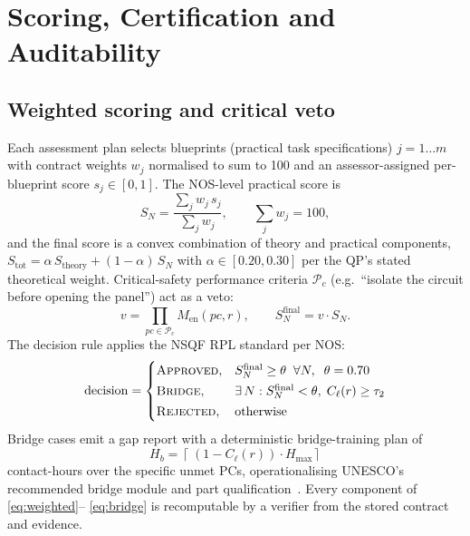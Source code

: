 \documentclass[conference]{IEEEtran}
\begin{document}
\section{Scoring, Certification and Auditability}
\label{sec:scoring}
\subsection{Weighted scoring and critical veto}
Each assessment plan selects blueprints (practical task specifications) $j=1\ldots m$ with
contract weights $w_j$ normalised to sum to 100 and an assessor-assigned per-blueprint
score $s_j \in [0,1]$. The NOS-level practical score is
\begin{equation}
S_N = \frac{\sum_{j} w_j\, s_j}{\sum_{j} w_j}, \qquad \sum_j w_j = 100,
\label{eq:weighted}
\end{equation}
and the final score is a convex combination of theory and practical components,
$S_{\mathrm{tot}} = \alpha\, S_{\mathrm{theory}} + (1-\alpha)\, S_N$ with
$\alpha \in [0.20, 0.30]$ per the QP's stated theoretical weight. Critical-safety
performance criteria $\mathcal{P}_c$ (e.g.\ ``isolate the circuit before opening the
panel'') act as a veto:
\begin{equation}
v = \prod_{pc \in \mathcal{P}_c} M_{\mathrm{en}}(pc, r), \qquad
S_N^{\mathrm{final}} = v \cdot S_N .
\label{eq:veto}
\end{equation}
The decision rule applies the NSQF RPL standard per NOS:
\begin{equation}
\mathrm{decision} = \begin{cases}
\textsc{Approved},    & S_N^{\mathrm{final}} \ge \theta \;\; \forall N, \;\; \theta = 0.70 \\[2pt]
\textsc{Bridge},      & \exists\, N : S_N^{\mathrm{final}} < \theta, \;
                        C_\ell(r) \ge \tau_2 \\[2pt]
\textsc{Rejected},    & \text{otherwise}
\end{cases}
\label{eq:decide}
\end{equation}
Bridge cases emit a gap report with a deterministic bridge-training plan of
\begin{equation}
H_b = \left\lceil\, (1 - C_\ell(r)) \cdot H_{\max} \right\rceil
\label{eq:bridge}
\end{equation}
contact-hours over the specific unmet PCs, operationalising UNESCO's recommended bridge
module and part qualification~\cite{unesco_uil}. Every component of \eqref{eq:weighted}--
\eqref{eq:bridge} is recomputable by a verifier from the stored contract and evidence.
\end{document}
